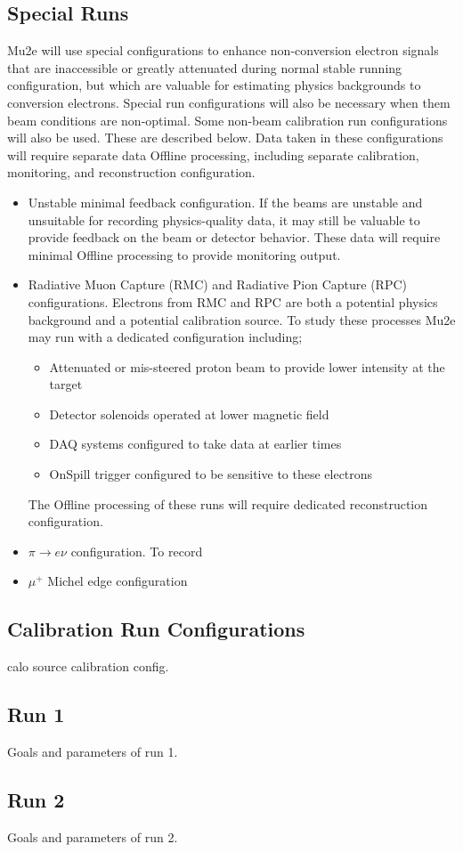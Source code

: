\subsection{Special Runs}
Mu2e will use special configurations to enhance non-conversion electron signals that are inaccessible or greatly attenuated during normal stable running configuration, but which are valuable for estimating physics backgrounds to conversion electrons.  Special run configurations will also be necessary when them beam conditions are non-optimal.  Some non-beam calibration run configurations will also be used.  These are described below. Data taken in these configurations will require separate data Offline processing, including separate calibration, monitoring, and reconstruction configuration.
\begin{itemize}
\item Unstable minimal feedback configuration.  If the beams are unstable and unsuitable for recording physics-quality data, it may still be valuable to provide feedback on the beam or detector behavior.  These data will require minimal Offline processing to provide monitoring output.
\item Radiative Muon Capture (RMC) and Radiative Pion Capture (RPC) configurations.  Electrons from RMC and RPC are both a potential physics background and a potential calibration source.  To study these processes Mu2e may run with a dedicated configuration including;
\begin{itemize}
    \item Attenuated or mis-steered proton beam to provide lower intensity at the target 
    \item Detector solenoids operated at lower magnetic field
    \item DAQ systems configured to take data at earlier times
    \item OnSpill trigger configured to be sensitive to these electrons    
\end{itemize}
The Offline processing of these runs will require dedicated reconstruction configuration.
\item $\pi \rightarrow e \nu$ configuration.  To record 
\item $\mu^{+}$ Michel edge configuration
\end{itemize}

\subsection{Calibration Run Configurations}
calo source calibration config.

\subsection{Run 1}
Goals and parameters of run 1.
\subsection{Run 2}
Goals and parameters of run 2.
